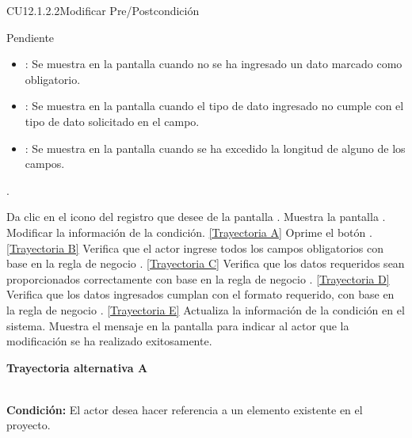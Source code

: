 \begin{UseCase}{CU12.1.2.2}{Modificar Pre/Postcondición}{
		
		Pendiente
		
	}
{\begin{itemize}
			\item {}: Se muestra en la pantalla  cuando no se ha ingresado un dato marcado como obligatorio.
			\item {}: Se muestra en la pantalla  cuando el tipo de dato ingresado no cumple con el tipo de dato solicitado en el campo.
			\item {}: Se muestra en la pantalla  cuando se ha excedido la longitud de alguno de los campos.
		\end{itemize}.}
\end{UseCase}
\begin{UCtrayectoria}
	\UCpaso[\UCactor] Da clic en el icono \editar del registro que desee de la pantalla .
	\UCpaso[\UCsist] Muestra la pantalla .
	\UCpaso[\UCactor] Modificar la información de la condición. \hyperlink{CU12-1-2-2:TAA}{[Trayectoria A]} \label{CU12.1.2.2-P3}
	\UCpaso[\UCactor] Oprime el botón . \hyperlink{CU12-1-2-2:TAB}{[Trayectoria B]} \label{CU12.1.2.2-P4}
	\UCpaso[\UCsist] Verifica que el actor ingrese todos los campos obligatorios con base en la regla de negocio . \hyperlink{CU12-1-2-2:TAC}{[Trayectoria C]}
	\UCpaso[\UCsist] Verifica que los datos requeridos sean proporcionados correctamente con base en la regla de negocio . \hyperlink{CU12-1-2-2:TAD}{[Trayectoria D]}
	\UCpaso[\UCsist] Verifica que los datos ingresados cumplan con el formato requerido, con base en la regla de negocio . \hyperlink{CU12-1-2-2:TAE}{[Trayectoria E]}
	\UCpaso[\UCsist] Actualiza la información de la condición en el sistema.
	\UCpaso[\UCsist] Muestra el mensaje  en la pantalla  para indicar al actor que la modificación se ha realizado exitosamente.
\end{UCtrayectoria}		
\hypertarget{CU12-1-2-2:TAA}{\textbf{Trayectoria alternativa A}}\\
\noindent \textbf{Condición:} El actor desea hacer referencia a un elemento existente en el proyecto.
